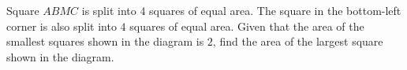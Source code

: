 Square $ABMC$ is split into $4$ squares of equal area. The square in the bottom-left corner is also split into $4$ squares of equal area. Given that the area of the smallest squares shown in the diagram is $2$, find the area of the largest square shown in the diagram.
